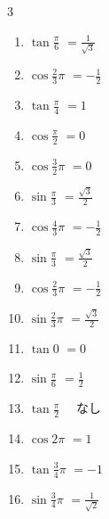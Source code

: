\begin{multicols}{3}
\begin{enumerate}
  \item $\displaystyle \tan{\frac{\pi}{6}}$
        $\displaystyle =\frac{1}{\sqrt{3}}$

  \item $\displaystyle \cos{\frac{2}{3}\pi}$
        $\displaystyle =-\frac{1}{2}$

  \item $\displaystyle \tan{\frac{\pi}{4}}$
        $\displaystyle =1$

  \item $\displaystyle \cos{\frac{\pi}{2}}$
        $\displaystyle =0$

  \item $\displaystyle \cos{\frac{3}{2}\pi}$
        $\displaystyle =0$

  \item $\displaystyle \sin{\frac{\pi}{3}}$
        $\displaystyle =\frac{\sqrt{3}}{2}$

  \item $\displaystyle \cos{\frac{4}{3}\pi}$
        $\displaystyle =-\frac{1}{2}$

\columnbreak %

  \item $\displaystyle \sin{\frac{\pi}{3}}$
        $\displaystyle =\frac{\sqrt{3}}{2}$

  \item $\displaystyle \cos{\frac{2}{3}\pi}$
        $\displaystyle =-\frac{1}{2}$

  \item $\displaystyle \sin{\frac{2}{3}\pi}$
        $\displaystyle =\frac{\sqrt{3}}{2}$

  \item $\displaystyle \tan{0}$
        $\displaystyle =0$

  \item $\displaystyle \sin{\frac{\pi}{6}}$
        $\displaystyle =\frac{1}{2}$

  \item $\displaystyle \tan{\frac{\pi}{2}}$
        $\displaystyle \quad なし$

  \item $\displaystyle \cos{2\pi}$
        $\displaystyle =1$

  \item $\displaystyle \tan{\frac{3}{4}\pi}$
        $\displaystyle =-1$

  \item $\displaystyle \sin{\frac{3}{4}\pi}$
        $\displaystyle =\frac{1}{\sqrt{2}}$


\end{enumerate}
\end{multicols}
